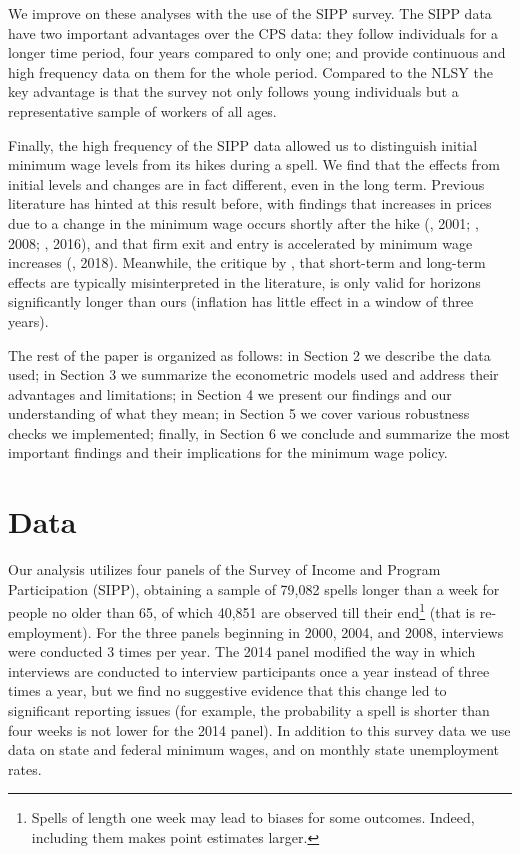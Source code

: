 \documentclass{article}
\begin{document}
We improve on these analyses with the use of the SIPP survey. The SIPP data have two important advantages over the CPS data: they follow individuals for a longer time period, four years compared to only one; and provide continuous and high frequency data on them for the whole period. Compared to the NLSY the key advantage is that the survey not only follows young individuals but a representative sample of workers of all ages. 

Finally, the high frequency of the SIPP data allowed us to distinguish initial minimum wage levels from its hikes during a spell. We find that the effects from initial levels and changes are in fact different, even in the long term. Previous literature has hinted at this result before, with findings that increases in prices due to a change in the minimum wage occurs shortly after the hike (\citeauthor{aaronson2001price}, 2001; \citeauthor{aaronson2008minimum}, 2008; \citeauthor{basker2016does}, 2016), and that firm exit and entry is accelerated by minimum wage increases (\citeauthor{aaronson2018industry}, 2018). Meanwhile, the critique by \cite{sorkin2015there}, that short-term and long-term effects are typically misinterpreted in the literature, is only valid for horizons significantly longer than ours (inflation has little effect in a window of three years).

The rest of the paper is organized as follows: in Section 2 we describe the data used; in Section 3 we summarize the econometric models used and address their advantages and limitations; in Section 4 we present our findings and our understanding of what they mean; in Section 5 we cover various robustness checks we implemented; finally, in Section 6 we conclude and summarize the most important findings and their implications for the minimum wage policy.

\section{Data}

Our analysis utilizes four panels of the Survey of Income and Program Participation (SIPP), obtaining a sample of 79,082 spells longer than a week for people no older than 65, of which 40,851 are observed till their end\footnote{Spells of length one week may lead to biases for some outcomes. Indeed, including them makes point estimates larger.} (that is re-employment). For the three panels beginning in 2000, 2004, and 2008, interviews were conducted 3 times per year. The 2014 panel modified the way in which interviews are conducted to interview participants once a year instead of three times a year, but we find no suggestive evidence that this change led to significant reporting issues (for example, the probability a spell is shorter than four weeks is not lower for the 2014 panel). In addition to this survey data we use data on state and federal minimum wages, and on monthly state unemployment rates.
\end{document}
